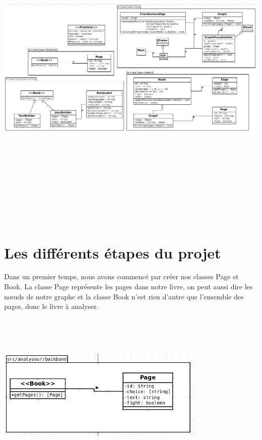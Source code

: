 \documentclass[12pt]{article}
\begin{document}
\includegraphics[width=17cm,height=16cm]{images/Diagramme2.png}
 
\section{Les différents étapes du projet}
	Dans un premier temps, nous avons commencé par créer nos classes Page et Book.
La classe Page représente les pages dans notre livre, on peut aussi dire les nœuds de notre graphe et la classe Book n'est rien d'autre que l'ensemble des pages, donc le livre à analyser.

\includegraphics[width=10cm,height=8cm]{images/BookPage.png} 	
\end{document}
